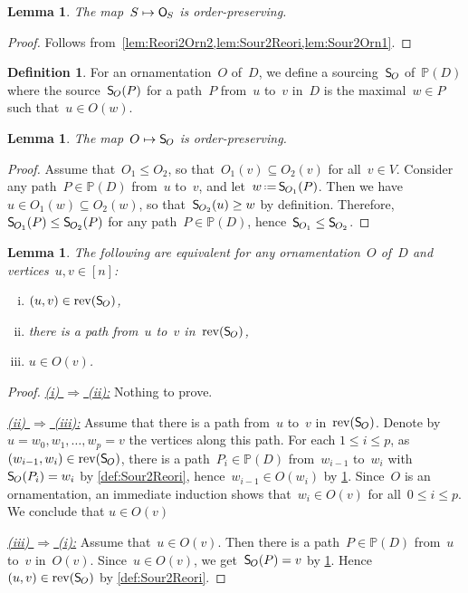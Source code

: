 \documentclass{amsart}
\newtheorem{lemma}[theorem]{Lemma}
\theoremstyle{definition}
\newtheorem{definition}[theorem]{Definition}
\newcommand{\eqdef}{\mbox{\,\raisebox{0.2ex}{\scriptsize\ensuremath{\mathrm:}}\ensuremath{=}\,}} %
\newcommand{\Vincent}[1]{\todo[size=\tiny,color=blue!30]{ #1 \\ \hfill --- V.}\,}
\newcommand{\mymap}[2]{\mathsf{#1}_{\hspace{-.7pt}#2}}
\newcommand{\orn}[1]{\mymap{O}{#1}}  %
\DeclareMathOperator{\rev}{rev} %
\newcommand{\sour}[1]{\mymap{S}{#1}}  %
\newcommand{\PP}{\mathbb P} %
\begin{document}
\begin{lemma}
\label{lem:Sour2Orn3}
The map~$S \mapsto \orn{S}$ is order-preserving.
\end{lemma}

\begin{proof}
Follows from~\cref{lem:Reori2Orn2,lem:Sour2Reori,lem:Sour2Orn1}.
\end{proof}

\begin{definition}
\label{def:Orn2Sour}
For an ornamentation~$O$ of~$D$, we define a sourcing~$\sour{O}$ of~$\PP(D)$ where the source~$\sour{O}(P)$ for a path~$P$ from~$u$ to~$v$ in~$D$ is the maximal~$w \in P$ such that~$u \in O(w)$.
\end{definition}

\begin{lemma}
\label{lem:Orn2Sour1}
The map~$O \mapsto \sour{O}$ is order-preserving.
\end{lemma}

\begin{proof}
Assume that~$O_1 \le O_2$, so that~$O_1(v) \subseteq O_2(v)$ for all~$v \in V$.
Consider any path~$P \in \PP(D)$ from~$u$ to~$v$, and let~$w \eqdef \sour{O_1}(P)$.
Then we have~$u \in O_1(w) \subseteq O_2(w)$, so that~$\sour{O_2}(u) \ge w$ by definition.
Therefore, $\sour{O_1}(P) \le \sour{O_2}(P)$ for any path~$P \in \PP(D)$, hence~${\sour{O_1} \le \sour{O_2}}$.
\end{proof}

\begin{lemma}
\label{lem:Orn2Sour2}
The following are equivalent for any ornamentation~$O$ of~$D$ and vertices~$u,v \in [n]$:
\begin{enumerate}[(i)]
\item $(u,v) \in \rev(\sour{O})$,
\item there is a path from~$u$ to~$v$ in~$\rev(\sour{O})$,
\item $u \in O(v)$.
\end{enumerate}
\end{lemma}

\begin{proof}
\uline{\textsl{(i) $\Rightarrow$ (ii):}}
Nothing to prove.

\medskip\noindent
\uline{\textsl{(ii) $\Rightarrow$ (iii):}}
Assume that there is a path from~$u$ to~$v$ in~$\rev(\sour{O})$.
Denote by~${u = w_0, w_1, \dots, w_p = v}$ the vertices along this path.
For each $1 \le i \le p$, as~$(w_{i-1}, w_i) \in \rev(\sour{O})$, there is a path~$P_i \in \PP(D)$ from~$w_{i-1}$ to~$w_i$ with~$\sour{O}(P_i) = w_i$ by \cref{def:Sour2Reori}, hence~$w_{i-1} \in O(w_i)$ by \cref{def:Orn2Sour}.
Since~$O$ is an ornamentation, an immediate induction shows that~$w_i \in O(v)$ for all~$0 \le i \le p$.
We conclude that $u \in O(v)$

\medskip\noindent
\uline{\textsl{(iii) $\Rightarrow$ (i):}}
Assume that~$u \in O(v)$.
Then there is a path~$P \in \PP(D)$ from~$u$ to~$v$ in~$O(v)$.
Since~${u \in O(v)}$, we get~$\sour{O}(P) = v$ by \cref{def:Orn2Sour}.
Hence~$(u,v) \in \rev(\sour{O})$ by \cref{def:Sour2Reori}.
\end{proof}
\end{document}
